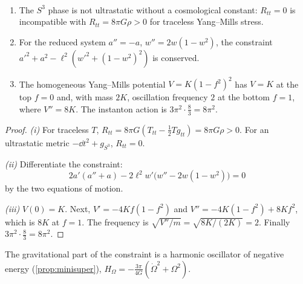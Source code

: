 \begin{proposition}\label{prop:s3sector}\ver\
\begin{enumerate}[label=(\roman*)]
\item The $S^3$ phase is not ultrastatic without a cosmological constant: $R_{tt}=0$ is incompatible with $R_{tt}=8\pi G\rho>0$ for traceless Yang--Mills stress.
\item For the reduced system $a''=-a$, $w''=2w(1-w^2)$, the constraint $a'^2+a^2-\ell^2(w'^2+(1-w^2)^2)$ is conserved.
\item The homogeneous Yang--Mills potential $V=K(1-f^2)^2$ has $V=K$ at the top $f=0$ and, with mass $2K$, oscillation frequency $2$ at the bottom $f=1$, where $V''=8K$. The instanton action is $3\pi^2\cdot\frac83=8\pi^2$.
\end{enumerate}
\end{proposition}
\begin{proof}
\emph{(i)} For traceless $T$, $R_{tt}=8\pi G(T_{tt}-\frac12Tg_{tt})=8\pi G\rho>0$. For an ultrastatic metric $-\dd t^2+g_{S^3}$, $R_{tt}=0$.

\emph{(ii)} Differentiate the constraint:
\[
2a'(a''+a)-2\ell^2w'\bigl(w''-2w(1-w^2)\bigr)=0
\]
by the two equations of motion.

\emph{(iii)} $V(0)=K$. Next, $V'=-4Kf(1-f^2)$ and $V''=-4K(1-f^2)+8Kf^2$, which is $8K$ at $f=1$. The frequency is $\sqrt{V''/m}=\sqrt{8K/(2K)}=2$. Finally $3\pi^2\cdot\frac83=8\pi^2$.
\end{proof}


The gravitational part of the constraint is a harmonic oscillator of negative energy (\cref{prop:minisuper}), $H_\Omega=-\frac{3\pi}{4G}(\dot\Omega^2+\Omega^2)$.

